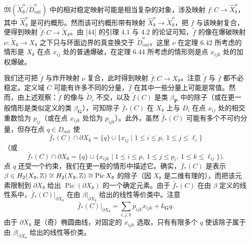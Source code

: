 \begin{remark}
$\overline{\mathfrak{M}}(\tilde X_{\mathfrak{d}}^o/\tilde D_{\mathrm{out}}^o)$ 中的相对稳定映射可能是相当复杂的对象，涉及映射 $f:C\to\hat X_{\mathfrak{d}}^o$，其中 $\hat X_{\mathfrak{d}}^o$ 是可约概形。然而该可约概形带有映射 $\hat X_{\mathfrak{d}}^o\to\tilde X_{\mathfrak{d}}^o$，把 $f$ 与该映射复合，便得到映射 $\tilde f:C\to\tilde X_{\mathfrak{d}}$。由 [44] 的引理 4.1 与 4.2 的论证可知，$\tilde f$ 的像在爆破映射 $\nu:\tilde X_{\mathfrak{d}}\to X_{\mathfrak{d}}$ 之下只与环面边界的真变换交于 $\tilde D_{\mathrm{out}}^o$。这里 $\nu$ 在定理 6.42 所考虑的情形是 $X_{\mathfrak{d}}$ 在点 $x_{ij}$ 处的普通爆破，在定理 6.44 所考虑的情形则是点 $x_{ijk}$ 处的加权爆破。
\end{remark}

我们还可把 $\tilde f$ 与炸开映射 $\nu$ 复合，此时得到映射 $\bar f:C\to X_{\mathfrak{d}}$。注意 $\tilde f$ 与 $\bar f$ 都不必稳定。定义域 $C$ 可能有许多不同的分量，$\bar f$ 在其中一些分量上可能是常值。然而，由上述观察：$\tilde f$ 的像与 $\tilde D_i$ 不交，以及 $\tilde f(C)$ 是类 $\beta_{\mathbf{P}}$ 中的除子（或在更一般情形是类似定义的类 $\beta_{\mathbf{G}}$），可知除子 $\bar f_*(C)$ 在 $X_{\mathfrak{d}}$ 上与 $D_i$ 在点 $x_{ij}$ 处的相交重数恰为 $p_{ij}$（或在点 $x_{ijk}$ 处恰为 $p_{ijk}$）。此外，虽然 $\bar f_*(C)$ 可能有多个不可约分量，但存在点 $q\in D_{\mathrm{out}}$ 使
\[
\bar f_*(C)\cap\partial X_{\mathfrak{d}}=\{q\}\cup\{x_{ij}\mid1\le i\le p,\ 1\le j\le\ell_i\}
\]
（或
\[
\bar f_*(C)\cap\partial X_{\mathfrak{d}}=\{q\}\cup\{x_{ijk}\mid1\le i\le p,\ 1\le j\le p_i,\ 1\le k\le\ell_{ij}\}).
\]
点 $q$ 还受一个约束，我们在更一般的情形中描述它。确实，$\bar f_*(C)$ 是表示 $\beta\in H_2(X_{\mathfrak{d}},\mathbb{Z})\cong H_2(X_{\mathfrak{d}},\mathbb{Z})\cong\operatorname{Pic}X_{\mathfrak{d}}$ 的除子（因 $X_{\mathfrak{d}}$ 是二维有理的），而把该元素限制到 $\partial X_{\mathfrak{d}}$ 给出 $\operatorname{Pic}(\partial X_{\mathfrak{d}})$ 的一个确定元素。由于 $\bar f_*(C)$ 在由 $\beta$ 定义的线性系中，$\bar f_*(C)|_{\partial X_{\mathfrak{d}}}$ 在由 $\beta|_{\partial X_{\mathfrak{d}}}$ 给出的线性等价类中。注意
\[
\bar f_*(C)|_{\partial X_{\mathfrak{d}}}=\sum_{i,j,k}p_{ijk}x_{ijk}+k_{\mathbf{G}}q.
\]
由于 $\partial X_{\mathfrak{d}}$ 是（奇）椭圆曲线，对固定的 $x_{ijk}$ 选取，只有有限多个 $q$ 使该除子属于由 $\beta|_{\partial X_{\mathfrak{d}}}$ 给出的线性等价类。

